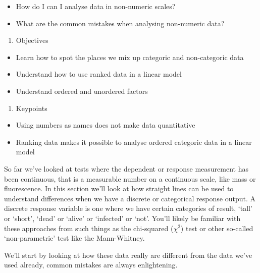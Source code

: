 \documentclass[
]{book}
\providecommand{\tightlist}{%
  \setlength{\itemsep}{0pt}\setlength{\parskip}{0pt}}
\begin{document}
\begin{itemize}
\tightlist
\item
  How do I can I analyse data in non-numeric scales?
\item
  What are the common mistakes when analysing non-numeric data?
\end{itemize}

\begin{enumerate}
\def\labelenumi{\arabic{enumi}.}
\setcounter{enumi}{1}
\tightlist
\item
  Objectives
\end{enumerate}

\begin{itemize}
\tightlist
\item
  Learn how to spot the places we mix up categoric and non-categoric data
\item
  Understand how to use ranked data in a linear model
\item
  Understand ordered and unordered factors
\end{itemize}

\begin{enumerate}
\def\labelenumi{\arabic{enumi}.}
\setcounter{enumi}{2}
\tightlist
\item
  Keypoints
\end{enumerate}

\begin{itemize}
\tightlist
\item
  Using numbers as names does not make data quantitative
\item
  Ranking data makes it possible to analyse ordered categoric data in a linear model
\end{itemize}

So far we've looked at tests where the dependent or response measurement has been continuous, that is a measurable number on a continuous scale, like mass or fluorescence. In this section we'll look at how straight lines can be used to understand differences when we have a discrete or categorical response output. A discrete response variable is one where we have certain categories of result, `tall' or `short', `dead' or `alive' or `infected' or `not'. You'll likely be familiar with these approaches from such things as the chi-squared (\(\chi^2\)) test or other so-called `non-parametric' test like the Mann-Whitney.

We'll start by looking at how these data really are different from the data we've used already, common mistakes are always enlightening.
\end{document}
